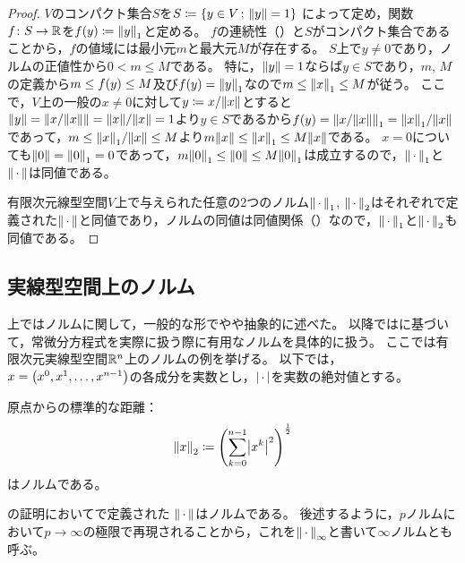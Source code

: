 \documentclass[b5paper,draft]{ltjsbook}
\begin{document}
\begin{thm}[有限次元線型空間上のノルムの同値性]
\begin{proof}
        $V$のコンパクト集合$S$を$S\coloneqq \sset{y\in V}{\norm{y}=1}$
        によって定め，関数$f\colon S\to \mathbb{R}$を$\fun{f}{y}\coloneqq \norm{y}_1$と定める。
        $f$の連続性（）と$S$がコンパクト集合であることから，$f$の値域には最小元$m$と最大元$M$が存在する。
        $S$上で$y\ne {0}$であり，ノルムの正値性から$0<m\leq M$である。
        特に，$\norm{y}=1$ならば$y\in S$であり，$m$, $M$の定義から$m\leq \fun{f}{y}\leq M$及び$\fun{f}{y}=\norm{y}_1$なので$m\leq \norm{x}_1\leq M$が従う。
        ここで，$V$上の一般の$x\ne 0$に対して$y\coloneqq x / \norm{x}$とすると$\norm{y}=\norm{x/\norm{x}}=\norm{x}/\norm{x}=1$より$y\in S$であるから$\fun{f}{y}=\norm{x/\norm{x}}_1=\norm{x}_1/\norm{x}$であって，$m\leq \norm{x}_1/\norm{x}\leq M$より$m\norm{x}\leq \norm{x}_1\leq M\norm{x}$である。
        $x=0$についても$\norm{0}=\norm{0}_1=0$であって，$m \norm{0}_1\leq \norm{0}\leq M\norm{0}_1$は成立するので，$\norm{\dummy}_1$と$\norm{\dummy}$は同値である。

        有限次元線型空間$V$上で与えられた任意の2つのノルム$\norm{\dummy}_1$, $\norm{\dummy}_2$はそれぞれで定義された$\norm{\dummy}$と同値であり，ノルムの同値は同値関係（）なので，$\norm{\dummy}_1$と$\norm{\dummy}_2$も同値である。
    \end{proof}
\end{thm}


\subsection{実線型空間上のノルム}
上ではノルムに関して，一般的な形でやや抽象的に述べた。
以降では\cite{takano}に基づいて，常微分方程式を実際に扱う際に有用なノルムを具体的に扱う。
ここでは有限次元実線型空間$\mathbb{R}^n$上のノルムの例を挙げる。
以下では，$x=\pare{x^0,x^1,\dots,x^{n-1}}$の各成分を実数とし，$\abs{\dummy}$を実数の絶対値とする。

\begin{eg}[Euclidノルム]
    原点からの標準的な距離：
    \begin{equation}
        \norm{x}_2\coloneqq \pare{\sum_{k=0}^{n-1} \abs{x^k}^2}^{\frac{1}{2}}
    \end{equation}
    はノルムである。
\end{eg}

\begin{eg}[一様ノルム]
    の証明においてで定義された
    $\norm{\dummy}$はノルムである。
    後述するように，$p$ノルムにおいて$p\to\infty$の極限で再現されることから，これを$\norm{\dummy}_\infty$と書いて$\infty$ノルムとも呼ぶ。
\end{eg}
\end{document}
